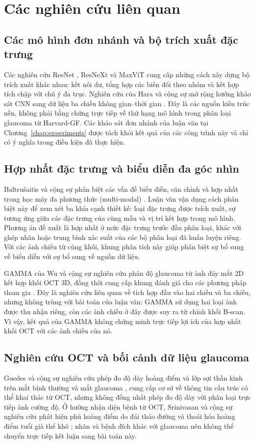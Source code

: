 \documentclass[14pt,a4paper,oneside]{extreport}
\begin{document}
\section{Các nghiên cứu liên quan}
\label{sec:related-fusion}
\subsection{Các mô hình đơn nhánh và bộ trích xuất đặc trưng}
Các nghiên cứu ResNet \cite{he2016resnet}, ResNeXt
\cite{xie2017resnext} và MaxViT \cite{tu2022maxvit} cung cấp những
cách xây dựng bộ trích xuất khác nhau: kết nối dư, tổng hợp các biến
đổi theo nhóm và kết hợp tích chập với chú ý đa trục. Nghiên cứu của
Hara và cộng sự mở rộng hướng khảo sát CNN sang dữ liệu ba chiều
không gian--thời gian \cite{hara2018spatiotemporal}. Đây là các nguồn
kiến trúc nền, không phải bằng chứng trực tiếp về thứ hạng mô hình
trong phân loại glaucoma từ Harvard-GF. Các khảo sát đơn nhánh của
luận văn tại Chương~\ref{chap:experiments} được tách khỏi kết quả của
các công trình này và chỉ có ý nghĩa trong điều kiện đã thực hiện.

\subsection{Hợp nhất đặc trưng và biểu diễn đa góc nhìn}
Baltrušaitis và cộng sự phân biệt các vấn đề biểu diễn, căn chỉnh và
hợp nhất trong học máy đa phương thức (multi-modal) \cite{baltrusaitis2017multimodal}.
Luận văn vận dụng cách phân biệt này để xem xét ba khía cạnh thiết kế:
loại đặc trưng được trích xuất, sự tương ứng giữa các đặc trưng của
cùng mẫu và vị trí kết hợp trong mô hình. Phương án đề xuất là hợp nhất
ở mức đặc trưng trước đầu phân loại, khác với ghép nhãn hoặc trung
bình xác suất của các bộ phân loại đã huấn luyện riêng. Với các ảnh
chiếu từ cùng khối, khung phân tích này giúp phân biệt sự bổ sung về
biểu diễn với sự bổ sung về nguồn dữ liệu.

GAMMA của Wu và cộng sự nghiên cứu phân độ glaucoma từ ảnh đáy mắt
2D kết hợp khối OCT 3D, đồng thời cung cấp khung đánh giá cho các phương pháp tham gia
\cite{wu2022gamma}. Đây là nghiên cứu liên quan về tích hợp đầu vào
hai chiều và ba chiều, nhưng không trùng với bài toán của luận văn:
GAMMA sử dụng hai loại ảnh được thu nhận riêng, còn các ảnh chiếu ở đây được
suy ra từ chính khối B-scan. Vì vậy, kết quả của GAMMA không chứng
minh trực tiếp lợi ích của hợp nhất khối OCT với các ảnh chiếu của nó.

\subsection{Nghiên cứu OCT và bối cảnh dữ liệu glaucoma}
Guedes và cộng sự nghiên cứu phép đo độ dày hoàng điểm và lớp sợi
thần kinh trên mắt bình thường và mắt glaucoma \cite{guedes2003oct},
cung cấp cơ sở về thông tin cấu trúc có thể khai thác từ OCT, nhưng
không đồng nhất phép đo độ dày với phân loại trực tiếp ảnh cường độ.
Ở hướng nhận diện bệnh từ OCT, Srinivasan và cộng sự nghiên cứu phát
hiện phù hoàng điểm do đái tháo đường và thoái hóa hoàng điểm tuổi
già thể khô \cite{srinivasan2014data}; nhãn và bệnh đích khác với
glaucoma nên không thể chuyển trực tiếp kết luận sang bài toán này.
\end{document}
